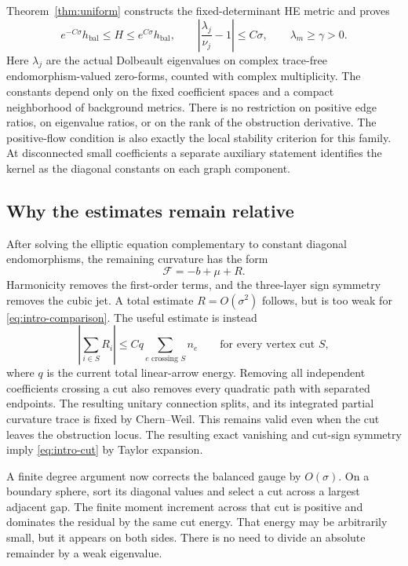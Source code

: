 \documentclass[11pt]{amsart}
\theoremstyle{definition}
\theoremstyle{remark}
\begin{document}
Theorem~\ref{thm:uniform} constructs the fixed-determinant HE metric and
proves
\begin{equation}\label{eq:intro-comparison}
 e^{-C\sigma}h_{\mathrm{bal}}\le H\le e^{C\sigma}h_{\mathrm{bal}},
 \qquad
 \left|\frac{\lambda_j}{\nu_j}-1\right|\le C\sigma,
 \qquad \lambda_m\ge\gamma>0.
\end{equation}
Here $\lambda_j$ are the actual Dolbeault eigenvalues on complex
trace-free endomorphism-valued zero-forms, counted with complex
multiplicity. The constants depend only on the fixed coefficient spaces
and a compact neighborhood of background metrics. There is no restriction
on positive edge ratios, on eigenvalue ratios, or on the rank of the
obstruction derivative. The positive-flow condition is also exactly the
local stability criterion for this family. At disconnected small
coefficients a separate auxiliary statement identifies the kernel as the
diagonal constants on each graph component.

\subsection{Why the estimates remain relative}
After solving the elliptic equation complementary to constant diagonal
endomorphisms, the remaining curvature has the form
\[
 \mathcal F=-b+\mu+R.
\]
Harmonicity removes the first-order terms, and the three-layer sign
symmetry removes the cubic jet. A total estimate $R=O(\sigma^2)$
follows, but is too weak for \eqref{eq:intro-comparison}. The useful
estimate is instead
\begin{equation}\label{eq:intro-cut}
 \left|\sum_{i\in S}R_i\right|
 \le Cq\sum_{e\text{ crossing }S}n_e
 \qquad\text{for every vertex cut }S,
\end{equation}
where $q$ is the current total linear-arrow energy.
Removing all independent coefficients crossing a cut also removes every
quadratic path with separated endpoints. The resulting unitary connection
splits, and its integrated partial curvature trace is fixed by Chern--Weil.
This remains valid even when the cut leaves the obstruction locus.
The resulting exact vanishing and cut-sign symmetry imply
\eqref{eq:intro-cut} by Taylor expansion.

A finite degree argument now corrects the balanced gauge by $O(\sigma)$.
On a boundary sphere, sort its diagonal values and select a cut across a
largest adjacent gap. The finite moment increment across that cut is
positive and dominates the residual by the same cut energy. That energy
may be arbitrarily small, but it appears on both sides. There is no need
to divide an absolute remainder by a weak eigenvalue.
\end{document}

